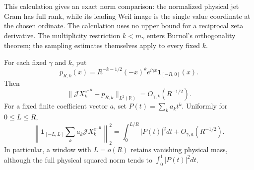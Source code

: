 This calculation gives an exact norm comparison: the normalized
physical jet Gram has full rank, while its leading Weil image is
the single value coordinate at the chosen ordinate. The calculation
uses no upper bound for a reciprocal zeta derivative. The
multiplicity restriction \(k<m_\gamma\) enters Burnol's
orthogonality theorem; the sampling estimates themselves apply to
every fixed \(k\).

\begin{proposition}
\label{prop:fd-burnol-physical-window}
For each fixed \(\gamma\) and \(k\), put
\[
 p_{R,k}(x)=R^{-k-1/2}(-x)^k e^{i\gamma x}
                            \mathbf1_{[-R,0]}(x).
\]
Then
\begin{equation}\label{eq:fd-burnol-physical-window}
 \|\mathcal JX_k^{e^{-R}}-p_{R,k}\|_{L^2(\mathbb R)}
                  =O_{\gamma,k}(R^{-1/2}).
\end{equation}
For a fixed finite coefficient vector \(a\), set
\(P(t)=\sum_k a_k t^k\). Uniformly for \(0\le L\le R\),
\[
 \left\|\mathbf1_{[-L,L]}
             \sum_k a_k\mathcal JX_k^{e^{-R}}\right\|_2^2
       =\int_0^{L/R}|P(t)|^2dt+O_{\gamma,a}(R^{-1/2}).
\]
In particular, a window with \(L=o(R)\) retains vanishing
physical mass, although the full physical squared norm tends to
\(\int_0^1|P(t)|^2dt\).
\end{proposition}

